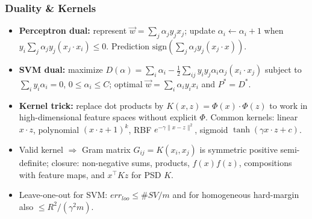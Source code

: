 \documentclass[10pt]{article}
\begin{document}
\begin{multicols}{2}
\subsubsection*{Duality \& Kernels}
\begin{itemize}
    \item \textbf{Perceptron dual:} represent $\vec{w}=\sum_j \alpha_j y_j x_j$; update $\alpha_i \leftarrow \alpha_i+1$ when $y_i\sum_j \alpha_j y_j(x_j\cdot x_i)\le0$. Prediction $\mathrm{sign}\left(\sum_j \alpha_j y_j (x_j\cdot x)\right)$.
    \item \textbf{SVM dual:} maximize $\displaystyle D(\alpha)=\sum_i \alpha_i-\frac{1}{2}\sum_{ij} y_i y_j \alpha_i \alpha_j (x_i\cdot x_j)$ subject to $\sum_i y_i\alpha_i=0$, $0\le \alpha_i\le C$; optimal $\vec{w}=\sum_i \alpha_i y_i x_i$ and $P^*=D^*$.
    \item \textbf{Kernel trick:} replace dot products by $K(x,z)=\Phi(x)\cdot\Phi(z)$ to work in high-dimensional feature spaces without explicit $\Phi$. Common kernels: linear $x\cdot z$, polynomial $(x\cdot z+1)^k$, RBF $e^{-\gamma\|x-z\|^2}$, sigmoid $\tanh(\gamma x\cdot z + c)$.
    \item Valid kernel $\Rightarrow$ Gram matrix $G_{ij}=K(x_i,x_j)$ is symmetric positive semi-definite; closure: non-negative sums, products, $f(x)f(z)$, compositions with feature maps, and $x^\top K z$ for PSD $K$.
    \item Leave-one-out for SVM: $err_{loo}\le \#SV/m$ and for homogeneous hard-margin also $\le R^2/(\gamma^2 m)$.
\end{itemize}


\end{multicols}
\end{document}
